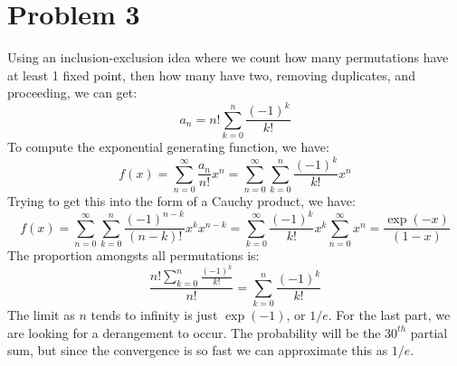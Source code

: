 \documentclass{article}
\begin{document}
    \section*{Problem 3}
        Using an inclusion-exclusion idea where we count how
        many permutations have at least 1 fixed point, then how
        many have two, removing duplicates, and proceeding, we
        can get:
        \begin{equation}
            a_{n}=n!\sum_{k=0}^{n}\frac{(-1)^{k}}{k!}
        \end{equation}
        To compute the exponential generating function, we have:
        \begin{equation}
            f(x)=\sum_{n=0}^{\infty}\frac{a_{n}}{n!}x^{n}
            =\sum_{n=0}^{\infty}\sum_{k=0}^{n}
                \frac{(-1)^{k}}{k!}x^{n}
        \end{equation}
        Trying to get this into the form of a Cauchy product,
        we have:
        \begin{equation}
            f(x)=\sum_{n=0}^{\infty}\sum_{k=0}^{n}
                \frac{(-1)^{n-k}}{(n-k)!}x^{k}x^{n-k}
                =\sum_{k=0}^{\infty}\frac{(-1)^{k}}{k!}x^{k}
                    \sum_{n=0}^{\infty}x^{n}
                    =\frac{\exp(-x)}{(1-x)}
        \end{equation}
        The proportion amongsts all permutations is:
        \begin{equation}
            \frac{n!\sum_{k=0}^{n}\frac{(-1)^{k}}{k!}}{n!}
            =\sum_{k=0}^{n}\frac{(-1)^{k}}{k!}
        \end{equation}
        The limit as $n$ tends to infinity is just $\exp(-1)$,
        or $1/e$. For the last part, we are looking for a
        derangement to occur. The probability will be the
        $30^{th}$ partial sum, but since the convergence is so
        fast we can approximate this as $1/e$.
\end{document}
